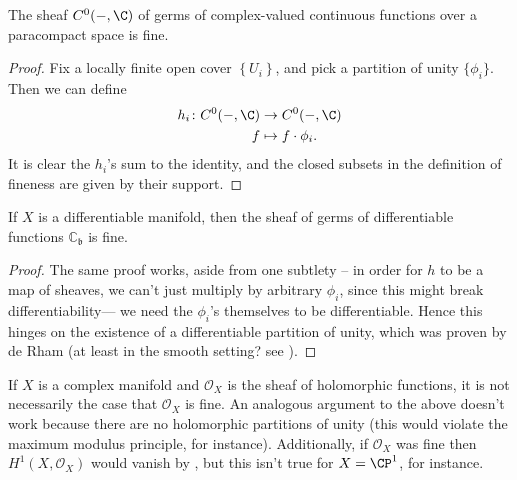 \documentclass[11pt]{amsart}
\begin{document}


\begin{example}\label{exa:cx-valued-cts-funcs-is-fine} 
The sheaf $C^0(-,\C)$ of germs of complex-valued continuous functions over a paracompact space is fine.
\end{example}
\begin{proof} Fix a locally finite open cover $\left\{ U_i \right\}$, and pick a partition of unity $\{\phi_i\}$. Then we can define
\begin{align*}
    h_i \colon C^0(-,\C) &\to C^0(-,\C) \\
    f &\mapsto f\cdot \phi_i.
\end{align*}
It is clear the $h_i$'s sum to the identity, and the closed subsets in the definition of fineness are given by their support.
\end{proof}

\begin{example} If $X$ is a differentiable manifold, then the sheaf of germs of differentiable functions $\mathbb{C}_{\mathfrak{b}}$ is fine.
\end{example}
\begin{proof} The same proof works, aside from one subtlety -- in order for $h$ to be a map of sheaves, we can't just multiply by arbitrary $\phi_i$, since this might break differentiability--- we need the $\phi_i$'s themselves to be differentiable. Hence this hinges on the existence of a differentiable partition of unity, which was proven by de Rham (at least in the smooth setting? see \cite[I.2]{derhamDifferentiableManifolds1984}). 
\end{proof}

\begin{remark} If $X$ is a complex manifold and $\mathcal{O}_X$ is the sheaf of holomorphic functions, it is not necessarily the case that $\mathcal{O}_X$ is fine. An analogous argument to the above doesn't work because there are no holomorphic partitions of unity (this would violate the maximum modulus principle, for instance). Additionally, if $\mathcal{O}_X$ was fine then $H^1(X,\mathcal{O}_X)$ would vanish by , but this isn't true for $X=\CP^1$, for instance.
\end{remark}
\end{document}
